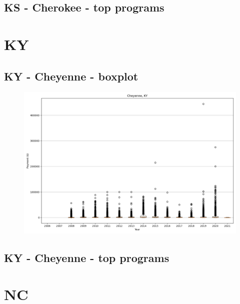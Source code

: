 \subsection*{KS - Cherokee - top programs}

\newpage
\section*{KY}
\subsection*{KY - Cheyenne - boxplot}
\begin{figure}[h]
\centering
\includegraphics[width=7in]{../output/boxplots/counties/Cheyenne-KY_boxplot.png}
\end{figure}


\subsection*{KY - Cheyenne - top programs}

\newpage
\section*{NC}
